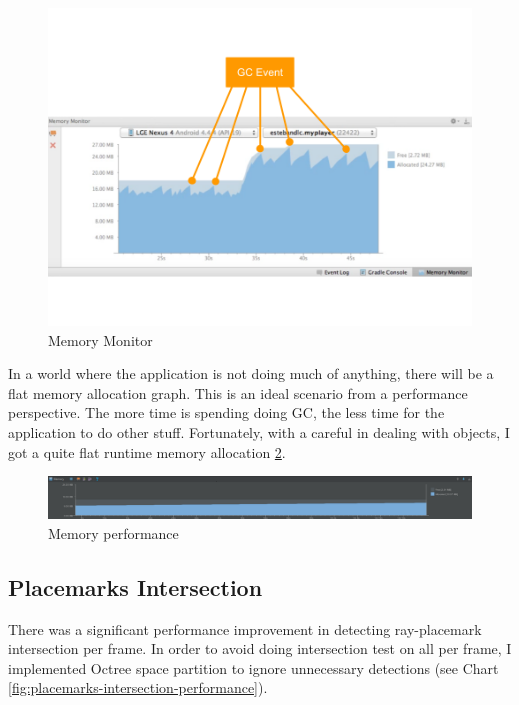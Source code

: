 \begin{figure}[H]
	\caption[Memory monitor]{Memory Monitor \cite{google.memory-monitor.2015}}
	\label{fig:memory-monitor}
	\centering
	\includegraphics[width=\textwidth, keepaspectratio]{Figures/memory-monitor.png}
	\decoRule
\end{figure}

In a world where the application is not doing much of anything, there will be a flat memory allocation graph. This is an ideal scenario from a performance perspective. The more time is spending doing GC, the less time for the application to do other stuff. Fortunately, with a careful in dealing with objects, I got a quite flat runtime memory allocation \ref{fig:memory-performance}.

\begin{figure}[H]
	\caption{Memory performance}
	\label{fig:memory-performance}
	\centering
	\includegraphics[width=\textwidth, keepaspectratio]{Figures/memory-performance.png}
	\decoRule
\end{figure}

\subsection{Placemarks Intersection}
\label{section:placemarks-intersection}

There was a significant performance improvement in detecting ray-placemark intersection per frame. In order to avoid doing intersection test on all  per frame, I implemented Octree space partition to ignore unnecessary detections (see Chart \ref{fig:placemarks-intersection-performance}).

